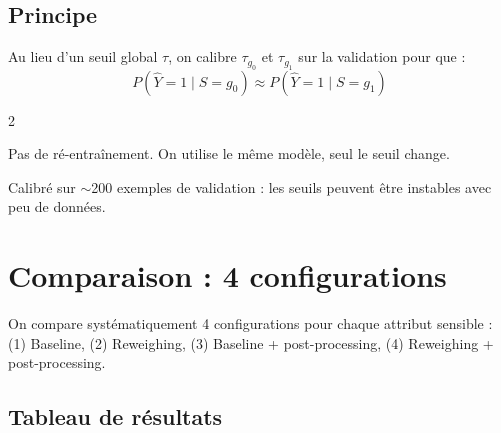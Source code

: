 \documentclass[11pt, a4paper]{article}
\begin{document}
\subsection{Principe}

Au lieu d'un seuil global $\tau$, on calibre $\tau_{g_0}$ et $\tau_{g_1}$ sur la validation pour que :
$$P(\hat{Y}{=}1 \mid S{=}g_0) \approx P(\hat{Y}{=}1 \mid S{=}g_1)$$

\begin{multicols}{2}
\begin{leconbox}[Avantage]
Pas de r\'{e}-entra\^{i}nement. On utilise le m\^{e}me mod\`{e}le, seul le seuil change.
\end{leconbox}

\begin{attentionbox}[Limite]
Calibr\'{e} sur $\sim$200 exemples de validation : les seuils peuvent \^{e}tre instables avec peu de donn\'{e}es.
\end{attentionbox}
\end{multicols}

\section{Comparaison : 4 configurations}
\label{sec:comparison}

\begin{questionbox}
On compare syst\'{e}matiquement 4 configurations pour chaque attribut sensible : (1) Baseline, (2) Reweighing, (3) Baseline + post-processing, (4) Reweighing + post-processing.
\end{questionbox}

\subsection{Tableau de r\'{e}sultats}
\end{document}
